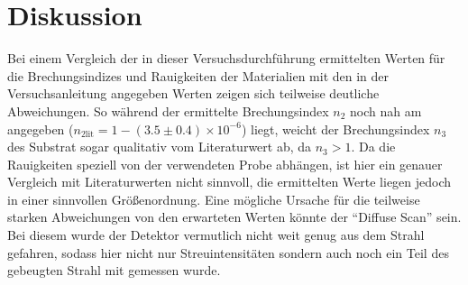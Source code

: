 

\section{Diskussion}

Bei einem Vergleich der in dieser Versuchsdurchführung ermittelten Werten für
die Brechungsindizes und Rauigkeiten der Materialien mit den in der Versuchsanleitung
angegeben Werten zeigen sich teilweise deutliche Abweichungen. So während der
ermittelte Brechungsindex $n_2$ noch nah am angegeben ($n_{2\text{lit}}=1-(3.5\pm0.4)\times
10^{-6}$) liegt, weicht der Brechungsindex $n_3$ des Substrat sogar qualitativ vom
Literaturwert ab, da $n_3>1$. Da die Rauigkeiten speziell von der verwendeten Probe
abhängen, ist hier ein genauer Vergleich mit Literaturwerten nicht sinnvoll, die
ermittelten Werte liegen jedoch in einer sinnvollen Größenordnung. Eine mögliche
Ursache für die teilweise starken Abweichungen von den erwarteten Werten könnte der
"`Diffuse Scan"' sein. Bei diesem wurde der Detektor vermutlich nicht weit genug
aus dem Strahl gefahren, sodass hier nicht nur Streuintensitäten sondern auch
noch ein Teil des gebeugten Strahl mit gemessen wurde.
